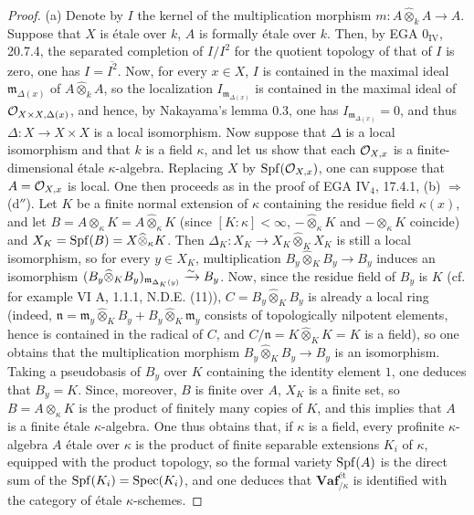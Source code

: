 \begin{proof}
(a) Denote by $I$ the kernel of the multiplication morphism $m:A\widehat\otimes_k A\to A$. Suppose that $X$ is étale over $k$, \ie $A$ is formally étale over $k$. Then, by EGA $0_{\mathrm{IV}}$, 20.7.4, the separated completion of $I/I^2$ for the quotient topology of that of $I$ is zero, \ie one has $I=\overline{I^2}$. Now, for every $x\in X$, $I$ is contained in the maximal ideal $\mathfrak m_{\Delta(x)}$ of $A\widehat\otimes_k A$, so the localization $I_{\mathfrak m_{\Delta(x)}}$ is contained in the maximal ideal of $\mathcal{O}_{X\times X,\Delta(x)}$, and hence, by Nakayama's lemma 0.3, one has $I_{\mathfrak m_{\Delta(x)}}=0$, and thus $\Delta:X\to X\times X$ is a local isomorphism.
Now suppose that $\Delta$ is a local isomorphism and that $k$ is a field $\kappa$, and let us show that each $\mathcal{O}_{X,x}$ is a finite-dimensional étale $\kappa$-algebra. Replacing $X$ by $\operatorname{Spf}(\mathcal{O}_{X,x})$, one can suppose that $A=\mathcal{O}_{X,x}$ is local. One then proceeds as in the proof of EGA IV$_4$, 17.4.1, (b) $\Rightarrow$ (d$''$). Let $K$ be a finite normal extension of $\kappa$ containing the residue field $\kappa(x)$, and let $B=A\otimes_\kappa K=A\widehat\otimes_\kappa K$ (since $[K:\kappa]<\infty$, $-\widehat\otimes_\kappa K$ and $-\otimes_\kappa K$ coincide) and $X_K=\operatorname{Spf}(B)=X\widehat\otimes_\kappa K$. Then $\Delta_K:X_K\to X_K\widehat\otimes_K X_K$ is still a local isomorphism, so for every $y\in X_K$, multiplication $B_y\widehat\otimes_K B_y\to B_y$ induces an isomorphism $(B_y\widehat\otimes_K B_y)_{\mathfrak m_{\Delta_K(y)}}\xrightarrow{\sim} B_y$. Now, since the residue field of $B_y$ is $K$ (cf. for example VI A, 1.1.1, N.D.E. (11)), $C=B_y\widehat\otimes_K B_y$ is already a local ring (indeed, $\mathfrak n=\mathfrak m_y\widehat\otimes_K B_y+B_y\widehat\otimes_K\mathfrak m_y$ consists of topologically nilpotent elements, hence is contained in the radical of $C$, and $C/\mathfrak n=K\widehat\otimes_K K=K$ is a field), so one obtains that the multiplication morphism $B_y\widehat\otimes_K B_y\to B_y$ is an isomorphism. Taking a pseudobasis of $B_y$ over $K$ containing the identity element $1$, one deduces that $B_y=K$. Since, moreover, $B$ is finite over $A$, $X_K$ is a finite set, so $B=A\otimes_\kappa K$ is the product of finitely many copies of $K$, and this implies that $A$ is a finite étale $\kappa$-algebra.
One thus obtains that, if $\kappa$ is a field, every profinite $\kappa$-algebra $A$ étale over $\kappa$ is the product of finite separable extensions $K_i$ of $\kappa$, equipped with the product topology, so the formal variety $\operatorname{Spf}(A)$ is the direct sum of the $\operatorname{Spf}(K_i)=\operatorname{Spec}(K_i)$, and one deduces that $\mathbf{Vaf}_{/\kappa}^{\text{ét}}$ is identified with the category of étale $\kappa$-schemes.

\end{proof}
